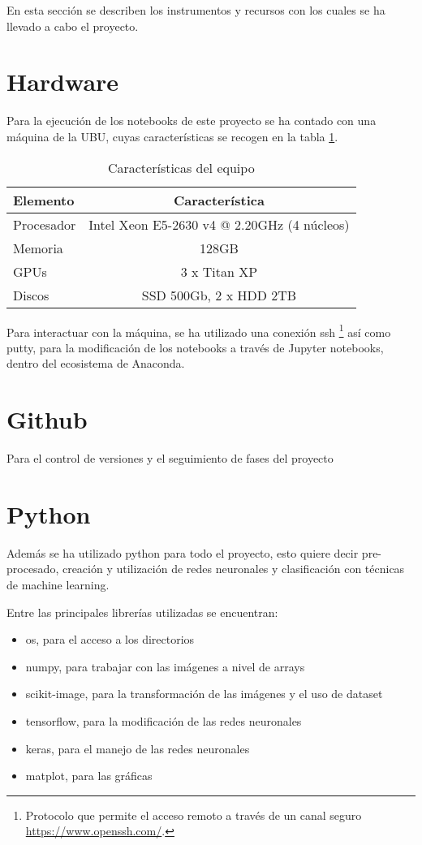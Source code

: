  \label{capitulo4}

En esta sección se describen los instrumentos y recursos con los cuales se ha llevado a cabo el proyecto. 

\section{Hardware}

Para la ejecución de los notebooks de este proyecto se ha contado con una máquina de la UBU, cuyas características se recogen en la tabla \ref{caracteristicaspc}.

\begin{table}
\begin{tabular}{l c}
Elemento & Característica \\
\hline
Procesador & Intel Xeon E5-2630 v4 @ 2.20GHz (4 núcleos)\\
Memoria & 128GB\\
GPUs & 3 x Titan XP\\
Discos & SSD 500Gb, 2 x HDD 2TB\\
\end{tabular}
\caption{\label{caracteristicaspc} Características del equipo}
\end{table}

Para interactuar con la máquina, se ha utilizado una conexión ssh \footnote{Protocolo que permite el acceso remoto a través de un canal seguro \url{https://www.openssh.com/}.} así como putty, para la modificación de los notebooks a través de Jupyter notebooks, dentro del ecosistema de Anaconda.

\section{Github}
Para el control de versiones y el seguimiento de fases del proyecto

\section{Python}

Además se ha utilizado python para todo el proyecto, esto quiere decir pre-procesado, creación y utilización de redes neuronales y clasificación con técnicas de 
machine learning.

Entre las principales librerías utilizadas se encuentran:

\begin{itemize}
    \item os, para el acceso a los directorios
    \item numpy, para trabajar con las imágenes a nivel de arrays
    \item scikit-image, para la transformación de las imágenes y el uso de dataset
    \item tensorflow, para la modificación de las redes neuronales
    \item keras, para el manejo de las redes neuronales
    \item matplot, para las gráficas
\end{itemize}

